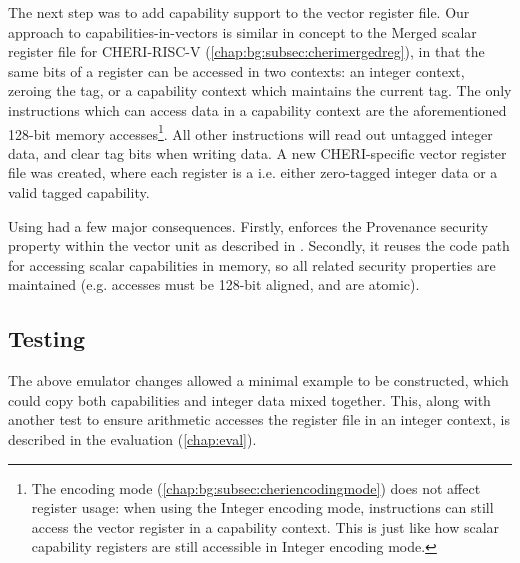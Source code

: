The next step was to add capability support to the vector register file.
Our approach to capabilities-in-vectors is similar in concept to the Merged scalar register file for CHERI-RISC-V (\cref{chap:bg:subsec:cherimergedreg}), in that the same bits of a register can be accessed in two contexts: an integer context, zeroing the tag, or a capability context which maintains the current tag.
The only instructions which can access data in a capability context are the aforementioned 128-bit memory accesses\footnote{The encoding mode (\cref{chap:bg:subsec:cheriencodingmode}) does not affect register usage: when using the Integer encoding mode, instructions can still access the vector register in a capability context. This is just like how scalar capability registers are still accessible in Integer encoding mode.}.
All other instructions will read out untagged integer data, and clear tag bits when writing data.
A new CHERI-specific vector register file was created, where each register is a   i.e. either zero-tagged integer data or a valid tagged capability.

Using  had a few major consequences.
Firstly,  enforces the Provenance security property within the vector unit as described in \todoref{}.
Secondly, it reuses the code path for accessing scalar capabilities in memory, so all related security properties are maintained (e.g. accesses must be 128-bit aligned, and are atomic).

\subsection{Testing}
The above emulator changes allowed a minimal  example to be constructed, which could copy both capabilities and integer data mixed together.
This, along with another test to ensure arithmetic accesses the register file in an integer context, is described in the evaluation (\cref{chap:eval}).

